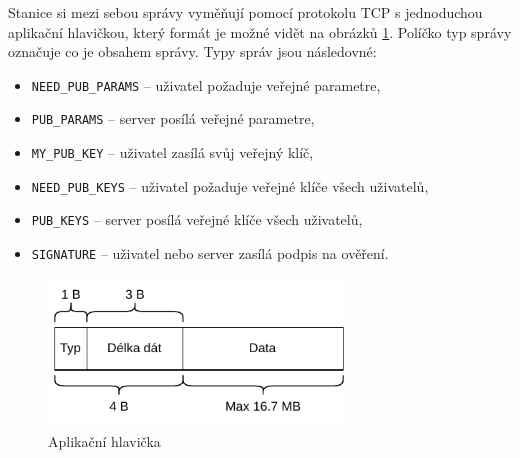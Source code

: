 Stanice si mezi sebou správy vyměňují pomocí protokolu TCP s jednoduchou aplikační hlavičkou, který formát je možné vidět na obrázků \ref{header}. Políčko typ správy označuje co je obsahem správy. Typy správ jsou následovné:
\begin{itemize}
  \item \texttt{NEED\_PUB\_PARAMS} -- uživatel požaduje veřejné parametre,
  \item \texttt{PUB\_PARAMS} -- server posílá veřejné parametre,
  \item \texttt{MY\_PUB\_KEY} -- uživatel zasílá svůj veřejný klíč,
  \item \texttt{NEED\_PUB\_KEYS} -- uživatel požaduje veřejné klíče všech uživatelů,
  \item \texttt{PUB\_KEYS} -- server posílá veřejné klíče všech uživatelů,
  \item \texttt{SIGNATURE} -- uživatel nebo server zasílá podpis na ověření.
\end{itemize}

\begin{figure}[htbp]
  \centering
  \includegraphics[width=0.7\textwidth]{img/header.pdf}
  \caption{Aplikační hlavička}
  \label{header}
\end{figure}

